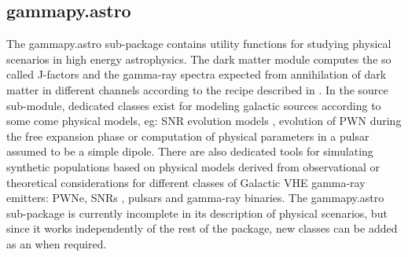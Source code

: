 \subsection{gammapy.astro}
\label{ssec:gammapy-astro}

The gammapy.astro sub-package contains utility functions for studying physical scenarios in high energy astrophysics.
The dark matter module computes the so called J-factors and the gamma-ray spectra expected from annihilation of dark matter in different channels according to the recipe described in \cite{2011JCAP...03..051C}. In the source sub-module, dedicated classes exist for modeling galactic sources according to some come physical models, eg: SNR evolution models \citep{1950RSPSA.201..159T, 1999ApJS..120..299T}, evolution of PWN during the free expansion phase \citep{2006ARA&A..44...17G} or computation of physical parameters in a pulsar assumed to be a simple dipole. There are also dedicated tools for simulating synthetic populations based on physical models derived from observational or theoretical considerations for different classes of Galactic VHE gamma-ray emitters: PWNe, SNRs \cite{1998ApJ...504..761C}, pulsars \cite{2006ApJ...643..332F, 2006MNRAS.372..777L, 2004A&A...422..545Y} and gamma-ray binaries. The gammapy.astro sub-package is currently incomplete in its description of physical scenarios, but since it works independently of the rest of the package, new classes can be added as an when required.